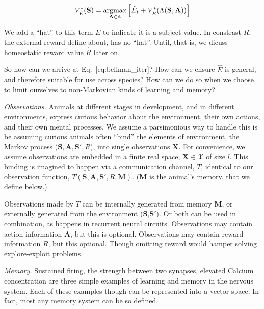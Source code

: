 \begin{equation} 
	\label{eq:bellman_iter_E}
	V^*_{\hat E}(\mathbf{S}) = \operatorname*{argmax}_{\mathbf{A} \in \mathbb{A}} \Big [ \hat E_{t}  + V^*_{\hat E}(\Lambda(\mathbf{S},\mathbf{A})) \Big ]
\end{equation}

We add a ``hat'' to this term $E$ to indicate it is a subject value. In constrast $R$, the external reward define about, has no ``hat''. Until, that is, we dicuss homeostatic reward value $\hat R$ later on. 

So how can we arrive at Eq.~\ref{eq:bellman_iter}? How can we ensure $\hat E$ is general, and therefore suitable for use across species? How can we do so when we choose to limit ourselves to non-Markovian kinds of learning and memory? 


\emph{Observations.} Animals at different stages in development, and in different environments, express curious behavior about the environment, their own actions, and their own mental processes. We assume a parsimonious way to handle this is be assuming curious animals often ``bind'' \cite{Robertson2003} the elements of environment, the Markov process ($\mathbf{S},\mathbf{A},\mathbf{S'},R$), into single observations $\mathbf{X}$. For convenience, we assume observations are embedded in a finite real space, $\mathbf{X} \in \mathcal{X}$ of size $l$. This binding is imagined to happen via a communication channel, $T$, identical to our observation function, $T(\mathbf{S},\mathbf{A},\mathbf{S'},R,\mathbf{M})$. ($\mathbf{M}$ is the animal's memory, that we define below.)

Observations made by $T$ can be internally generated from memory $\mathbf{M}$, or externally generated from the environment ($\mathbf{S}$,$\mathbf{S'}$). Or both can be used in combination, as happens in recurrent neural circuits. Observations may contain action information $\mathbf{A}$, but this is optional. Observations may contain reward information $R$, but this optional. Though omitting reward would hamper solving explore-exploit problems. 

\emph{Memory.} Sustained firing, the strength between two synapses, elevated Calcium concentration are three simple examples of learning and memory in the nervous system. Each of these examples though can be represented into a vector space. In fact, most any memory system can be so defined. 

